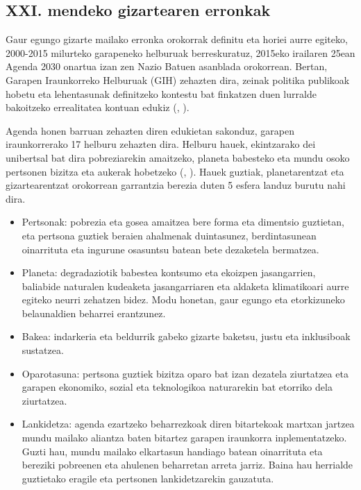 \subsection{XXI. mendeko gizartearen erronkak}\label{subsec:xxi_erronkak}

Gaur egungo gizarte mailako erronka orokorrak definitu eta horiei aurre egiteko, 2000-2015 milurteko garapeneko helburuak berreskuratuz, 2015eko irailaren 25ean Agenda 2030 onartua izan zen Nazio Batuen asanblada orokorrean. Bertan, Garapen Iraunkorreko Helburuak (GIH) zehazten dira, zeinak politika publikoak hobetu eta lehentasunak definitzeko kontestu bat finkatzen duen lurralde bakoitzeko errealitatea kontuan edukiz (\citeauthor{vasco2017contribucion}, \citeyear{vasco2017contribucion}).

Agenda honen barruan zehazten diren edukietan sakonduz, garapen iraunkorrerako 17 helburu zehazten dira. Helburu hauek, ekintzarako dei unibertsal bat dira pobreziarekin amaitzeko, planeta babesteko eta mundu osoko pertsonen bizitza eta aukerak hobetzeko (\citeauthor{nbe2021}, \citeyear{nbe2021}). Hauek guztiak, planetarentzat eta gizartearentzat orokorrean garrantzia berezia duten 5 esfera landuz burutu nahi dira.

\begin{itemize}
    \item Pertsonak: pobrezia eta gosea amaitzea bere forma eta dimentsio guztietan, eta pertsona guztiek beraien ahalmenak duintasunez, berdintasunean oinarrituta eta ingurune osasuntsu batean bete dezaketela bermatzea.
    \item Planeta: degradaziotik babestea kontsumo eta ekoizpen jasangarrien, baliabide naturalen kudeaketa jasangarriaren eta aldaketa klimatikoari aurre egiteko neurri zehatzen bidez. Modu honetan, gaur egungo eta etorkizuneko belaunaldien beharrei erantzunez.
    \item Bakea: indarkeria eta beldurrik gabeko gizarte baketsu, justu eta inklusiboak sustatzea.
    \item Oparotasuna: pertsona guztiek bizitza oparo bat izan dezatela ziurtatzea eta garapen ekonomiko, sozial eta teknologikoa naturarekin bat etorriko dela ziurtatzea.
    \item Lankidetza: agenda ezartzeko beharrezkoak diren bitartekoak martxan jartzea mundu mailako aliantza baten bitartez garapen iraunkorra inplementatzeko. Guzti hau, mundu mailako elkartasun handiago batean oinarrituta eta bereziki pobreenen eta ahulenen beharretan arreta jarriz. Baina hau herrialde guztietako eragile eta pertsonen lankidetzarekin gauzatuta.
\end{itemize}

